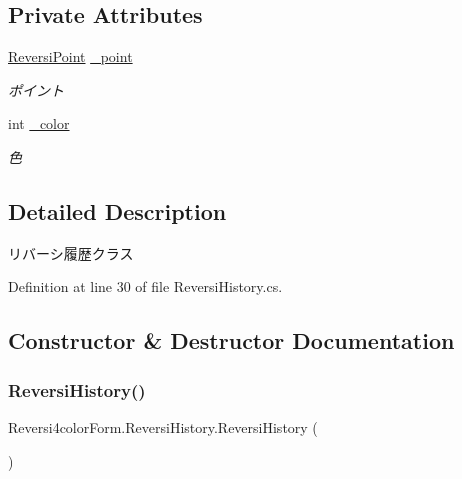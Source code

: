 \subsection*{Private Attributes}
\begin{DoxyCompactItemize}
\item 
\mbox{\label{class_reversi4color_form_1_1_reversi_history_ae13e200702ffce12bb52eec2becf1fb2}} 
\hyperlink{class_reversi4color_form_1_1_reversi_point}{Reversi\+Point} \hyperlink{class_reversi4color_form_1_1_reversi_history_ae13e200702ffce12bb52eec2becf1fb2}{\+\_\+point}
\begin{DoxyCompactList}\small\item\em ポイント \end{DoxyCompactList}\item 
\mbox{\label{class_reversi4color_form_1_1_reversi_history_a20799a12597572172714474d1917905a}} 
int \hyperlink{class_reversi4color_form_1_1_reversi_history_a20799a12597572172714474d1917905a}{\+\_\+color}
\begin{DoxyCompactList}\small\item\em 色 \end{DoxyCompactList}\end{DoxyCompactItemize}


\subsection{Detailed Description}
リバーシ履歴クラス 

Definition at line 30 of file Reversi\+History.\+cs.



\subsection{Constructor \& Destructor Documentation}
\mbox{\label{class_reversi4color_form_1_1_reversi_history_a90caf6857e6bae3a51be28ac48cd7d70}} 
\subsubsection{\texorpdfstring{Reversi\+History()}{ReversiHistory()}}
{\footnotesize\ttfamily Reversi4color\+Form.\+Reversi\+History.\+Reversi\+History (\begin{DoxyParamCaption}{ }\end{DoxyParamCaption})}



